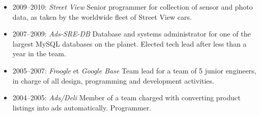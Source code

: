 \begin{langen}
\end{langen}
\begin{langfr}
\end{langfr}

\vspace{4 mm}

\begin{langen}
\begin{itemize}%
\vspace{2 mm}
\item 2009--2010: \textit{Street View} Senior programmer for collection of sensor and photo data, as taken by the worldwide fleet of Street View cars.
\item 2007--2009: \textit{Ads-SRE-DB} Database and systems administrator for one of the largest MySQL databases on the planet. Elected tech lead after less than a year in the team.
\item 2005--2007: \textit{Froogle} et \textit{Google Base} Team lead for a team of 5 junior engineers, in charge of all design, programming and development activities.
\item 2004--2005: \textit{Ads/Deli} Member of a team charged with converting product listings into ads automatically. Programmer.
\end{itemize}
\end{langen}

